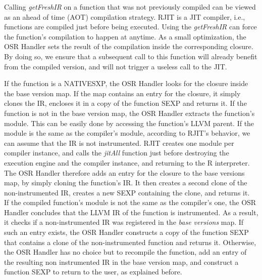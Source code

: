 Calling \textit{getFreshIR} on a function that was not previously compiled can be viewed as an ahead of time (AOT) compilation strategy.
RJIT is a JIT compiler, i.e., functions are compiled just before being executed.
Using the \textit{getFreshIR} can force the function's compilation to happen at anytime.
As a small optimization, the OSR Handler sets the result of the compilation inside the corresponding closure.
By doing so, we ensure that a subsequent call to this function will already benefit from the compiled version, and will not trigger a useless call to the JIT.\\


If the function is a NATIVESXP, the OSR Handler looks for the closure inside the base version map. 
If the map contains an entry for the closure, it simply clones the IR, encloses it in a copy of the function SEXP and returns it.
If the function is not in the base version map, the OSR Handler extracts the function's module.
This can be easily done by accessing the function's LLVM parent.
If the module is the same as the compiler's module, according to RJIT's behavior, we can assume that the IR is not instrumented.
RJIT creates one module per compiler instance, and calls the \textit{jitAll} function just before destroying the execution engine and the compiler instance, and returning to the R interpreter.
The OSR Handler therefore adds an entry for the closure to the base versions map, by simply cloning the function's IR. 
It then creates a second clone of the non-instrumented IR, creates a new SEXP containing the clone, and returns it.\\

If the compiled function's module is not the same as the compiler's one, the OSR Handler concludes that the LLVM IR of the function is instrumented.
As a result, it checks if a non-instrumented IR was registered in the \textit{base versions} map.
If such an entry exists, the OSR Handler constructs a copy of the function SEXP that contains a clone of the non-instrumented function and returns it.
Otherwise, the OSR Handler has no choice but to recompile the function, add an entry of the resulting non instrumented IR in the base version map, and construct a function SEXP to return to the user, as explained before.\\


